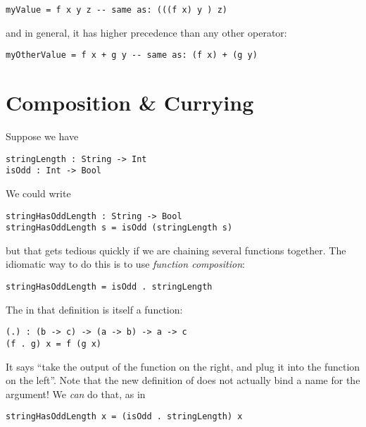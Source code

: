 \begin{lstlisting}[language=pseudoml]
myValue = f x y z -- same as: (((f x) y ) z)
\end{lstlisting}

\noindent and in general, it has higher precedence than any other operator:

\begin{lstlisting}[language=pseudoml]
myOtherValue = f x + g y -- same as: (f x) + (g y)
\end{lstlisting}

\section{Composition \& Currying}

Suppose we have

\begin{lstlisting}[language=pseudoml]
stringLength : String -> Int
isOdd : Int -> Bool
\end{lstlisting}

We could write

\begin{lstlisting}[language=pseudoml]
stringHasOddLength : String -> Bool
stringHasOddLength s = isOdd (stringLength s)
\end{lstlisting}

\noindent but that gets tedious quickly if we are chaining several functions together. The idiomatic way to do this is to use \emph{function composition}:

\begin{lstlisting}[language=pseudoml]
stringHasOddLength = isOdd . stringLength
\end{lstlisting}

The  in that definition is itself a function:

\begin{lstlisting}[language=pseudoml]
(.) : (b -> c) -> (a -> b) -> a -> c
(f . g) x = f (g x)
\end{lstlisting}

\noindent It says ``take the output of the function on the right, and plug it into the function on the left''. Note that the new definition of  does not actually bind a name for the argument! We \emph{can} do that, as in

\begin{lstlisting}[language=pseudoml]
stringHasOddLength x = (isOdd . stringLength) x
\end{lstlisting}

